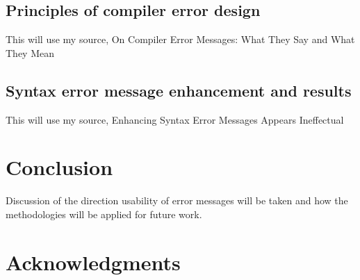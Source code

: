 \documentclass{sig-alternate}
\begin{document}
\subsection{Principles of compiler error design}\label{subsec:compiler error design}
This will use my source, On Compiler Error Messages: What They Say and What They Mean

\subsection{Syntax error message enhancement and results}\label{subsec:syntax enhancement}
This will use my source, Enhancing Syntax Error Messages Appears Ineffectual


\section{Conclusion}\label{sec:concl}
Discussion of the direction usability of error messages will be taken and how the methodologies will be applied for future work.



\section{Acknowledgments}\label{sec:ackn}




  

~\cite{Denny:2014:ESE:2591708.2591748}
~\cite{Hartmann:2010:OPS:1753326.1753478}
~\cite{Isa:1983:MOE:800045.801583}
~\cite{Kummerfeld:2003:NBF:858403.858416}
~\cite{Marceau:2011:MEE:1953163.1953308}
~\cite{Marceau:2011:MYL:2048237.2048241}
~\cite{Murphy:2008:BTD:1352135.1352193}
~\cite{Traver:2010}
\end{document}
